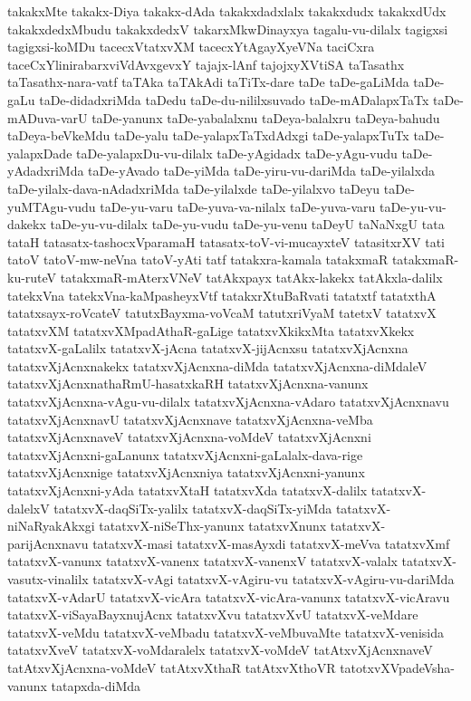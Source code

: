 {takakxMte
takakx-Diya
takakx-dAda
takakxdadxlalx
takakxdudx
takakxdUdx
takakxdedxMbudu
takakxdedxV
takarxMkwDinayxya
tagalu-vu-dilalx
tagigxsi
tagigxsi-koMDu
tacecxVtatxvXM
tacecxYtAgayXyeVNa
taciCxra
taceCxYlinirabarxviVdAvxgevxY
tajajx-lAnf
tajojxyXVtiSA
taTasathx
taTasathx-nara-vatf
taTAka
taTAkAdi
taTiTx-dare
taDe
taDe-gaLiMda
taDe-gaLu
taDe-didadxriMda
taDedu
taDe-du-nililxsuvado
taDe-mADalapxTaTx
taDe-mADuva-varU
taDe-yanunx
taDe-yabalalxnu
taDeya-balalxru
taDeya-bahudu
taDeya-beVkeMdu
taDe-yalu
taDe-yalapxTaTxdAdxgi
taDe-yalapxTuTx
taDe-yalapxDade
taDe-yalapxDu-vu-dilalx
taDe-yAgidadx
taDe-yAgu-vudu
taDe-yAdadxriMda
taDe-yAvado
taDe-yiMda
taDe-yiru-vu-dariMda
taDe-yilalxda
taDe-yilalx-dava-nAdadxriMda
taDe-yilalxde
taDe-yilalxvo
taDeyu
taDe-yuMTAgu-vudu
taDe-yu-varu
taDe-yuva-va-nilalx
taDe-yuva-varu
taDe-yu-vu-dakekx
taDe-yu-vu-dilalx
taDe-yu-vudu
taDe-yu-venu
taDeyU
taNaNxgU
tata
tataH
tatasatx-tashocxVparamaH
tatasatx-toV-vi-mucayxteV
tatasitxrXV
tati
tatoV
tatoV-mw-neVna
tatoV-yAti
tatf
tatakxra-kamala
tatakxmaR
tatakxmaR-ku-ruteV
tatakxmaR-mAterxVNeV
tatAkxpayx
tatAkx-lakekx
tatAkxla-dalilx
tatekxVna
tatekxVna-kaMpasheyxVtf
tatakxrXtuBaRvati
tatatxtf
tatatxthA
tatatxsayx-roVcateV
tatutxBayxma-voVcaM
tatutxriVyaM
tatetxV
tatatxvX
tatatxvXM
tatatxvXMpadAthaR-gaLige
tatatxvXkikxMta
tatatxvXkekx
tatatxvX-gaLalilx
tatatxvX-jAcna
tatatxvX-jijAcnxsu
tatatxvXjAcnxna
tatatxvXjAcnxnakekx
tatatxvXjAcnxna-diMda
tatatxvXjAcnxna-diMdaleV
tatatxvXjAcnxnathaRmU-hasatxkaRH
tatatxvXjAcnxna-vanunx
tatatxvXjAcnxna-vAgu-vu-dilalx
tatatxvXjAcnxna-vAdaro
tatatxvXjAcnxnavu
tatatxvXjAcnxnavU
tatatxvXjAcnxnave
tatatxvXjAcnxna-veMba
tatatxvXjAcnxnaveV
tatatxvXjAcnxna-voMdeV
tatatxvXjAcnxni
tatatxvXjAcnxni-gaLanunx
tatatxvXjAcnxni-gaLalalx-dava-rige
tatatxvXjAcnxnige
tatatxvXjAcnxniya
tatatxvXjAcnxni-yanunx
tatatxvXjAcnxni-yAda
tatatxvXtaH
tatatxvXda
tatatxvX-dalilx
tatatxvX-dalelxV
tatatxvX-daqSiTx-yalilx
tatatxvX-daqSiTx-yiMda
tatatxvX-niNaRyakAkxgi
tatatxvX-niSeThx-yanunx
tatatxvXnunx
tatatxvX-parijAcnxnavu
tatatxvX-masi
tatatxvX-masAyxdi
tatatxvX-meVva
tatatxvXmf
tatatxvX-vanunx
tatatxvX-vanenx
tatatxvX-vanenxV
tatatxvX-valalx
tatatxvX-vasutx-vinalilx
tatatxvX-vAgi
tatatxvX-vAgiru-vu
tatatxvX-vAgiru-vu-dariMda
tatatxvX-vAdarU
tatatxvX-vicAra
tatatxvX-vicAra-vanunx
tatatxvX-vicAravu
tatatxvX-viSayaBayxnujAcnx
tatatxvXvu
tatatxvXvU
tatatxvX-veMdare
tatatxvX-veMdu
tatatxvX-veMbadu
tatatxvX-veMbuvaMte
tatatxvX-venisida
tatatxvXveV
tatatxvX-voMdaralelx
tatatxvX-voMdeV
tatAtxvXjAcnxnaveV
tatAtxvXjAcnxna-voMdeV
tatAtxvXthaR
tatAtxvXthoVR
tatotxvXVpadeVsha-vanunx
tatapxda-diMda
}
